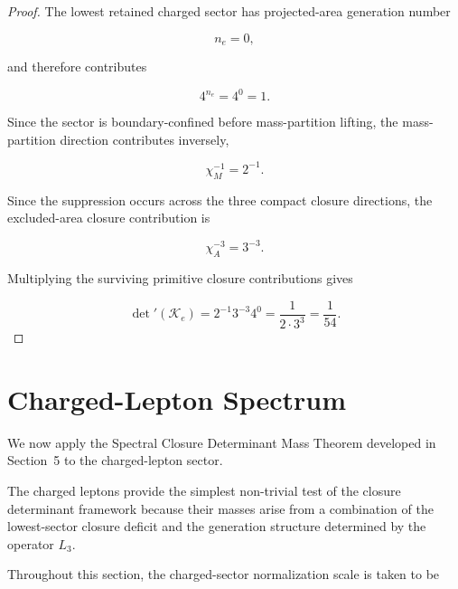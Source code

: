 \documentclass[11pt]{article}
\theoremstyle{definition}
\theoremstyle{remark}
\begin{document}
\begin{proof}

The lowest retained charged sector has projected-area generation
number

\begin{equation}
n_e =
0,
\end{equation}

and therefore contributes

\begin{equation}
4^{n_e} = 4^0 = 1.
\end{equation}

Since the sector is boundary-confined before mass-partition
lifting, the mass-partition direction contributes inversely,

\begin{equation}
\chi_M^{-1} =
2^{-1}.
\end{equation}

Since the suppression occurs across the three compact closure
directions, the excluded-area closure contribution is

\begin{equation}
\chi_A^{-3} =
3^{-3}.
\end{equation}

Multiplying the surviving primitive closure contributions gives

\begin{equation}
\det{}'(\mathcal K_e)
=
2^{-1}3^{-3}4^0
=
\frac{1}{2\cdot 3^3}
=
\frac{1}{54}.
\label{eq:electron_determinant}
\end{equation}

\end{proof}


\section{Charged-Lepton Spectrum}
\label{sec:charged_lepton_spectrum}

We now apply the Spectral Closure Determinant Mass Theorem
developed in Section~5 to the charged-lepton sector.

The charged leptons provide the simplest non-trivial test of the
closure determinant framework because their masses arise from a
combination of the lowest-sector closure deficit and the
generation structure determined by the operator \(L_3\).

Throughout this section, the charged-sector normalization scale
is taken to be
\end{document}
